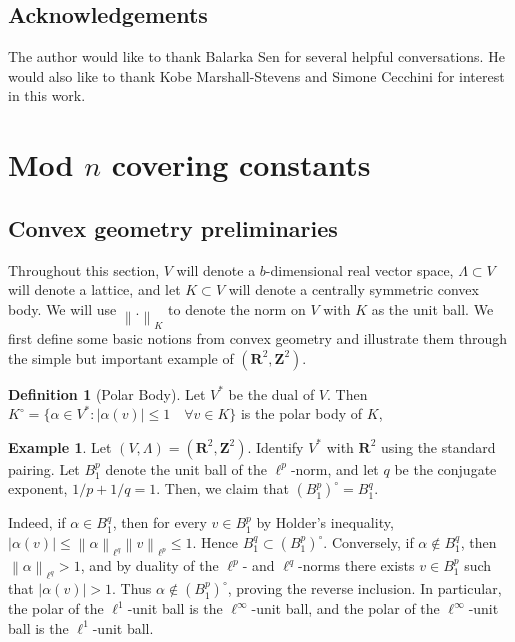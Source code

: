 \documentclass[11pt,reqno]{amsart}
\numberwithin{equation}{section}
\numberwithin{equation}{section}
\theoremstyle{definition}
\newtheorem{definition}[theorem]{Definition}
\newtheorem{exam}[theorem]{Example}
\newcommand{\R}{\mathbf R}
\newcommand{\Z}{\mathbf Z}
\newcommand{\norm}[1]{\left\lVert #1\right\rVert}
\begin{document}
\subsection{Acknowledgements} The author would like to thank Balarka Sen for several helpful conversations. He would also like to thank Kobe Marshall-Stevens and Simone Cecchini for interest in this work.

\section{Mod $n$ covering constants}
\label{sec:theta}

\subsection{Convex geometry preliminaries} Throughout this section, \(V\) will denote a $b$-dimensional real vector space, \(\Lambda\subset V\) will denote a lattice, and let \(K\subset V\) will denote a centrally symmetric convex body. We will use $\norm{.}_{K}$ to denote the norm on $V$ with $K$ as the unit ball. We first define some basic notions from convex geometry and illustrate them through the simple but important example of $(\R^2,\Z^2)$.

\begin{definition}[Polar Body] \label{def:polar}
    Let $V^*$ be the dual of $V$. Then \(K^\circ=\{\alpha\in V^\ast:|\alpha(v)|\le1 \quad \forall v\in K\}\)  is the polar body of $K$,
\end{definition}
\begin{exam}
Let \((V,\Lambda)=(\R^2,\Z^2)\). Identify \(V^*\) with \(\R^2\) using the standard pairing. Let \(B_1^p\) denote the unit ball of the \(\ell^p\)-norm, and let \(q\) be the conjugate exponent, $1/p +1/q =1$. Then, we claim that \( (B_1^p)^\circ=B_1^q. \) 

Indeed, if \(\alpha\in B_1^q\), then for every \(v\in B_1^p\) by Holder's inequality, \(|\alpha(v)|\le \norm{\alpha}_{\ell^q}\norm{v}_{\ell^p}\le 1.\) Hence \(B_1^q\subset (B_1^p)^\circ\). Conversely, if \(\alpha\notin B_1^q\), then \(\norm{\alpha}_{\ell^q}>1\), and by duality of the \(\ell^p\)- and \(\ell^q\)-norms there exists \(v\in B_1^p\) such that \(|\alpha(v)|>1\). Thus \(\alpha\notin (B_1^p)^\circ\), proving the reverse inclusion. In particular, the polar of the \(\ell^1\)-unit ball is the \(\ell^\infty\)-unit ball, and the polar of the \(\ell^\infty\)-unit ball is the \(\ell^1\)-unit ball.
\end{exam}
\end{document}
